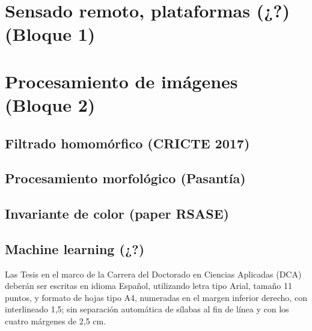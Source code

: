 \section{Sensado remoto, plataformas (¿?) (Bloque 1)}

\section{Procesamiento de imágenes (Bloque 2)}

\subsection{Filtrado homomórfico (CRICTE 2017)}
\subsection{Procesamiento morfológico (Pasantía)}
\subsection{Invariante de color (paper RSASE)}
\subsection{Machine learning (¿?)}




Las Tesis  en el marco de la Carrera del Doctorado en Ciencias Aplicadas (DCA) deberán ser escritas en idioma Español, utilizando letra tipo Arial, tamaño 11 puntos, y formato de hojas tipo A4, numeradas en el margen inferior derecho, con interlineado 1,5; sin separación automática de sílabas al fin de línea y con los cuatro márgenes de 2,5 cm.

